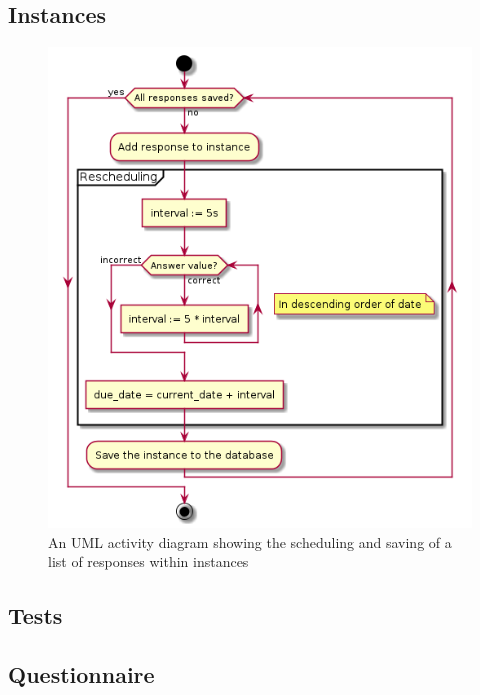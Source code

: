 \subsection{Instances}

\begin{figure}
\centering
    \includegraphics[height=.5\textheight]{img/learningserver.png}
\caption{An UML activity diagram showing the scheduling and saving of a list of responses within instances}
\label{fig:learningserver}
\end{figure}

\subsection{Tests}

\subsection{Questionnaire}
